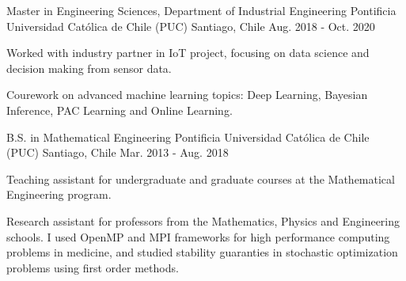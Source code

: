 

\begin{cventries}
\cventry
{Master in Engineering Sciences, Department of Industrial Engineering} %
{Pontificia Universidad Católica de Chile (PUC)} %
{Santiago, Chile} %
{Aug. 2018 - Oct. 2020} %
{
  \begin{cvitems} %
    \item {Worked with industry partner in IoT project, focusing on data science and decision making from sensor data.}
    \item {Courework on advanced machine learning topics: Deep Learning, Bayesian Inference, PAC Learning and Online Learning.} 
  \end{cvitems}
}

  \cventry
    {B.S. in Mathematical Engineering} %
    {Pontificia Universidad Católica de Chile (PUC)} %
    {Santiago, Chile} %
    {Mar. 2013 - Aug. 2018} %
    {
      \begin{cvitems} %
        \item {Teaching assistant for undergraduate and graduate courses at the Mathematical Engineering program.}
        \item {Research assistant for professors from the Mathematics, Physics and Engineering schools. 
        I used OpenMP and MPI frameworks for high performance computing problems in medicine, and studied stability
        guaranties in stochastic optimization problems using first order methods.}
      \end{cvitems}
    }

\end{cventries}
